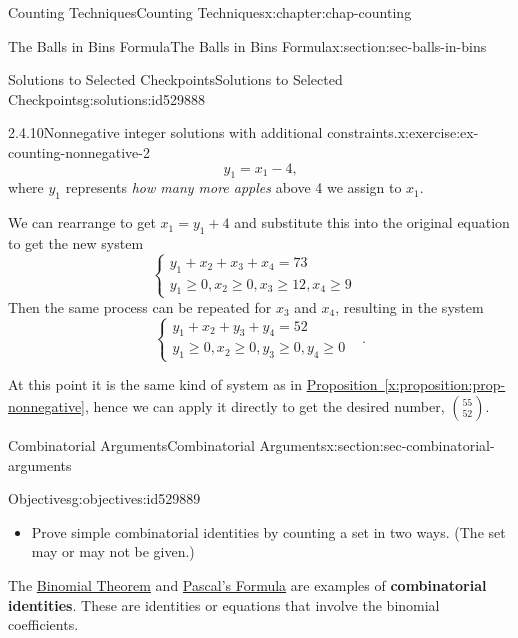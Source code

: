 \documentclass[oneside,10pt,]{book}
\newcommand{\xreffont}{\relax}
\newcommand{\terminology}[1]{\textbf{#1}}
\numberwithin{equation}{section}
\newcommand{\amp}{&}
\begin{document}
\begin{chapterptx}{Counting Techniques}{}{Counting Techniques}{}{}{x:chapter:chap-counting}
\begin{sectionptx}{The Balls in Bins Formula}{}{The Balls in Bins Formula}{}{}{x:section:sec-balls-in-bins}
\begin{solutions-subsection-numberless}{Solutions to Selected Checkpoints}{}{Solutions to Selected Checkpoints}{}{}{g:solutions:id529888}
\begin{inlinesolution}{2.4.10}{Nonnegative integer solutions with additional constraints.}{x:exercise:ex-counting-nonnegative-2}
\begin{equation*}
y_1 = x_1 - 4\text{,}
\end{equation*}
where \(y_1\) represents \emph{how many more apples} above 4 we assign to \(x_1\).%
\par
We can rearrange to get \(x_1 = y_1 + 4\) and substitute this into the original equation to get the new system%
\begin{equation*}
\begin{cases}
y_1 + x_2 + x_3 + x_4 = 73 \amp \\ y_1 \geq 0, x_2 \geq 0, x_3 \geq 12, x_4 \geq 9 \amp
\end{cases}
\end{equation*}
Then the same process can be repeated for \(x_3\) and \(x_4\), resulting in the system%
\begin{equation*}
\begin{cases}
y_1 + x_2 + y_3 + y_4 = 52 \amp \\ y_1 \geq 0, x_2 \geq 0, y_3 \geq 0, y_4 \geq 0 \amp
\end{cases}\text{.}
\end{equation*}
%
\par
At this point it is the same kind of system as in \hyperref[x:proposition:prop-nonnegative]{Proposition~{\xreffont\ref{x:proposition:prop-nonnegative}}}, hence we can apply it directly to get the desired number, \(\displaystyle\binom{55}{52}\).%
\end{inlinesolution}%
\end{solutions-subsection-numberless}
\end{sectionptx}
%
%
\typeout{************************************************}
\typeout{************************************************}
%
\begin{sectionptx}{Combinatorial Arguments}{}{Combinatorial Arguments}{}{}{x:section:sec-combinatorial-arguments}
\begin{objectives}{Objectives}{g:objectives:id529889}
%
\begin{itemize}[label=\textbullet]
\item{}Prove simple combinatorial identities by counting a set in two ways. (The set may or may not be given.)%
\end{itemize}
\end{objectives}
The \hyperref[x:theorem:thm-binomial]{Binomial Theorem} and \hyperref[x:theorem:thm-pascals-formula]{Pascal's Formula} are examples of \terminology{combinatorial identities}. These are identities or equations that involve the binomial coefficients.%

\end{sectionptx}
\end{chapterptx}
\end{document}
